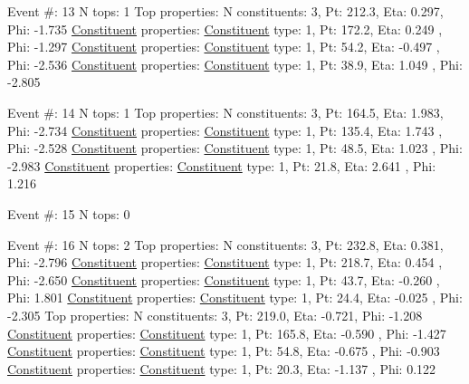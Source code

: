 \begin{DoxyCode}
Event #: 13
      N tops: 1
      Top properties: N constituents:   3,   Pt:  212.3,   Eta:   0.297,   Phi:  -1.735
          \hyperlink{classConstituent}{Constituent} properties: \hyperlink{classConstituent}{Constituent} type:   1,   Pt:  172.2,   Eta:   0.249
      ,   Phi:  -1.297
          \hyperlink{classConstituent}{Constituent} properties: \hyperlink{classConstituent}{Constituent} type:   1,   Pt:   54.2,   Eta:  -0.497
      ,   Phi:  -2.536
          \hyperlink{classConstituent}{Constituent} properties: \hyperlink{classConstituent}{Constituent} type:   1,   Pt:   38.9,   Eta:   1.049
      ,   Phi:  -2.805

Event #: 14
      N tops: 1
      Top properties: N constituents:   3,   Pt:  164.5,   Eta:   1.983,   Phi:  -2.734
          \hyperlink{classConstituent}{Constituent} properties: \hyperlink{classConstituent}{Constituent} type:   1,   Pt:  135.4,   Eta:   1.743
      ,   Phi:  -2.528
          \hyperlink{classConstituent}{Constituent} properties: \hyperlink{classConstituent}{Constituent} type:   1,   Pt:   48.5,   Eta:   1.023
      ,   Phi:  -2.983
          \hyperlink{classConstituent}{Constituent} properties: \hyperlink{classConstituent}{Constituent} type:   1,   Pt:   21.8,   Eta:   2.641
      ,   Phi:   1.216

Event #: 15
      N tops: 0

Event #: 16
      N tops: 2
      Top properties: N constituents:   3,   Pt:  232.8,   Eta:   0.381,   Phi:  -2.796
          \hyperlink{classConstituent}{Constituent} properties: \hyperlink{classConstituent}{Constituent} type:   1,   Pt:  218.7,   Eta:   0.454
      ,   Phi:  -2.650
          \hyperlink{classConstituent}{Constituent} properties: \hyperlink{classConstituent}{Constituent} type:   1,   Pt:   43.7,   Eta:  -0.260
      ,   Phi:   1.801
          \hyperlink{classConstituent}{Constituent} properties: \hyperlink{classConstituent}{Constituent} type:   1,   Pt:   24.4,   Eta:  -0.025
      ,   Phi:  -2.305
      Top properties: N constituents:   3,   Pt:  219.0,   Eta:  -0.721,   Phi:  -1.208
          \hyperlink{classConstituent}{Constituent} properties: \hyperlink{classConstituent}{Constituent} type:   1,   Pt:  165.8,   Eta:  -0.590
      ,   Phi:  -1.427
          \hyperlink{classConstituent}{Constituent} properties: \hyperlink{classConstituent}{Constituent} type:   1,   Pt:   54.8,   Eta:  -0.675
      ,   Phi:  -0.903
          \hyperlink{classConstituent}{Constituent} properties: \hyperlink{classConstituent}{Constituent} type:   1,   Pt:   20.3,   Eta:  -1.137
      ,   Phi:   0.122


\end{DoxyCode}
